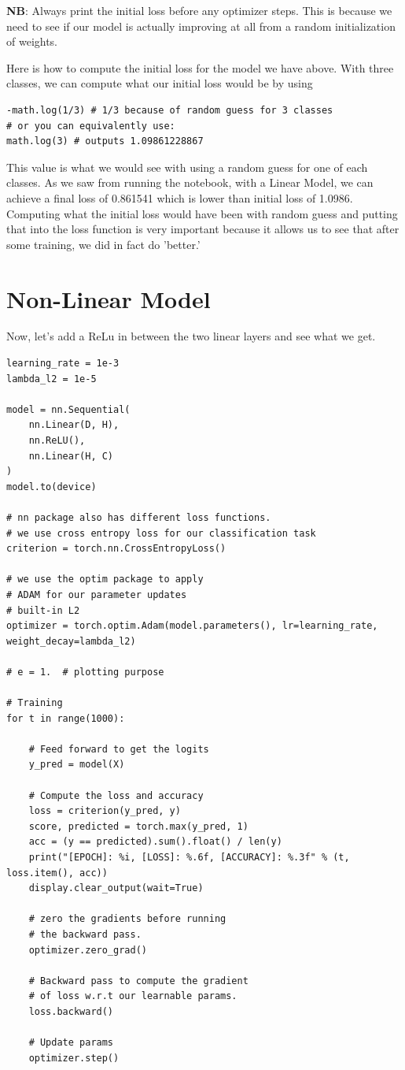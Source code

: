 \textbf{NB}: Always print the initial loss before any optimizer steps. 
This is because we need to see if our model is actually improving at all from a random initialization of weights. 

Here is how to compute the initial loss for the model we have above. With three classes, we can compute what our initial loss would be by using
\begin{verbatim}
-math.log(1/3) # 1/3 because of random guess for 3 classes
# or you can equivalently use:
math.log(3) # outputs 1.09861228867
\end{verbatim}

This value is what we would see with using a random guess for one of each classes. As we saw from running the notebook, with a Linear Model, we can achieve a final loss of 0.861541 which is lower than initial loss of 1.0986. Computing what the initial loss would have been with random guess and putting that into the loss function is very important because it allows us to see that after some training, we did in fact do 'better.'

\section{Non-Linear Model}

Now, let's add a ReLu in between the two linear layers and see what we get.
\begin{verbatim}
learning_rate = 1e-3
lambda_l2 = 1e-5

model = nn.Sequential(
    nn.Linear(D, H),
    nn.ReLU(),
    nn.Linear(H, C)
)
model.to(device)

# nn package also has different loss functions.
# we use cross entropy loss for our classification task
criterion = torch.nn.CrossEntropyLoss()

# we use the optim package to apply
# ADAM for our parameter updates
# built-in L2
optimizer = torch.optim.Adam(model.parameters(), lr=learning_rate, weight_decay=lambda_l2)

# e = 1.  # plotting purpose

# Training
for t in range(1000):
    
    # Feed forward to get the logits
    y_pred = model(X)
    
    # Compute the loss and accuracy
    loss = criterion(y_pred, y)
    score, predicted = torch.max(y_pred, 1)
    acc = (y == predicted).sum().float() / len(y)
    print("[EPOCH]: %i, [LOSS]: %.6f, [ACCURACY]: %.3f" % (t, loss.item(), acc))
    display.clear_output(wait=True)
    
    # zero the gradients before running
    # the backward pass.
    optimizer.zero_grad()
    
    # Backward pass to compute the gradient
    # of loss w.r.t our learnable params. 
    loss.backward()
    
    # Update params
    optimizer.step()
\end{verbatim}

